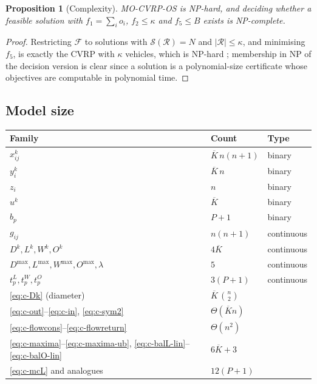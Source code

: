 \documentclass[11pt,a4paper]{article}
\theoremstyle{definition}
\theoremstyle{plain}
\newtheorem{proposition}[definition]{Proposition}
\newcommand{\Feas}{\mathcal{F}}
\newcommand{\Routes}{\mathcal{R}}
\newcommand{\Ground}{\mathcal{S}}
\newcommand{\Cust}{N}
\newcommand{\Lmax}{L^{\max}}
\newcommand{\Wmax}{W^{\max}}
\newcommand{\Omax}{O^{\max}}
\newcommand{\Dmax}{D^{\max}}
\begin{document}
\begin{proposition}[Complexity]
\label{prop:hardness}
\textup{\textsc{MO-CVRP-OS}} is NP-hard, and deciding whether a feasible solution with
$f_1 = \sum_{i}o_i$, $f_2 \le \kappa$ and $f_5 \le B$ exists is NP-complete.
\end{proposition}

\begin{proof}
Restricting $\Feas$ to solutions with $\Ground(\Routes) = \Cust$ and
$|\Routes| \le \kappa$, and minimising $f_5$, is exactly the CVRP with $\kappa$
vehicles, which is NP-hard \cite{TothVigo2014}; membership in NP of the decision
version is clear since a solution is a polynomial-size certificate whose
objectives are computable in polynomial time.
\end{proof}

\subsection{Model size}
\label{sec:milp-size}

\begin{center}
\begin{tabular}{@{}lll@{}}
\toprule
Family & Count & Type \\
\midrule
$x^k_{ij}$   & $\overline{K}\,n(n+1)$ & binary \\
$y^k_i$      & $\overline{K}\,n$      & binary \\
$z_i$        & $n$                    & binary \\
$u^k$        & $\overline{K}$         & binary \\
$b_p$        & $P+1$                  & binary \\
$g_{ij}$     & $n(n+1)$               & continuous \\
$D^k, L^k, W^k, O^k$ & $4\overline{K}$ & continuous \\
$\Dmax,\Lmax,\Wmax,\Omax,\lambda$ & $5$ & continuous \\
$t^{L}_p, t^{W}_p, t^{O}_p$ & $3(P+1)$ & continuous \\
\midrule
\eqref{eq:c-Dk} (diameter)      & $\overline{K}\,\binom{n}{2}$ & \\
\eqref{eq:c-out}--\eqref{eq:c-in}, \eqref{eq:c-sym2} & $\Theta(\overline{K} n)$ & \\
\eqref{eq:c-flowcons}--\eqref{eq:c-flowreturn} & $\Theta(n^2)$ & \\
\eqref{eq:c-maxima}--\eqref{eq:c-maxima-ub}, \eqref{eq:c-balL-lin}--\eqref{eq:c-balO-lin}
  & $6\overline{K}+3$ & \\
\eqref{eq:c-mcL} and analogues  & $12(P+1)$ & \\
\bottomrule
\end{tabular}
\end{center}
\end{document}
